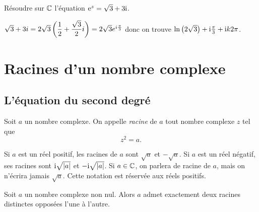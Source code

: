 \documentclass{magnolia}
\begin{document}
\begin{exoUnique}
\exo Résoudre sur $\mathbb{C}$ l'équation ${\rm e}^z=\sqrt{3}+3{\rm i}$.
  \begin{sol}
  $\sqrt{3}+3i=2\sqrt{3}\left(\dfrac{1}{2}+\dfrac{\sqrt 3}{2}i\right)=2\sqrt{3}e^{i\frac{\pi}{3}}$ donc on trouve $\ln\left(2\sqrt{3}\right)+{\rm i}\frac{\pi}{3}+{\rm i} k2\pi$.
  \end{sol}
\end{exoUnique}

\section{Racines d'un nombre complexe}
\subsection{L'équation du second degré}

\begin{definition}[utile=-3]
Soit $a$ un nombre complexe. On appelle \emph{racine} de $a$ tout nombre complexe $z$
tel que
\[z^2=a.\]
\end{definition}

\begin{remarques}
\remarque Si $a$ est un réel positif, les racines de $a$ sont $\sqrt{a}$ et $-\sqrt{a}$.
  Si $a$ est un réel négatif, ses racines sont ${\rm i}\sqrt{\left|a\right|}$ et
  $-{\rm i}\sqrt{\left|a\right|}$.
\remarque Si $a\in\mathbb{C}$, on parlera de racine de $a$, mais on n'écrira jamais $\sqrt{a}$. Cette notation est réservée aux réels positifs.
\end{remarques}

\begin{proposition}[utile=-3]
Soit $a$ un nombre complexe non nul. Alors $a$ admet exactement deux
racines distinctes opposées l'une à l'autre.
\end{proposition}
\end{document}
